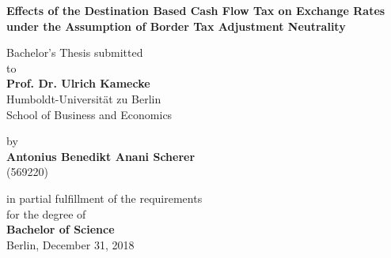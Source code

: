 \begin{center}

    {\Large{\bf Effects of the Destination Based Cash Flow Tax on Exchange Rates under the Assumption of Border Tax Adjustment Neutrality}} \vspace{0.5cm}


    {\normalsize Bachelor's Thesis submitted\\\vspace{0.5cm}
    to}\\\vspace{0.5cm}
    {\normalsize{\bf Prof. Dr. Ulrich Kamecke}} \\\vspace{0.5cm}
    {\normalsize Humboldt-Universit\"at zu Berlin \\
    School of Business and Economics \\} \vspace{1cm}


    {\normalsize by \\\vspace{0.5cm}
    {\bf Antonius Benedikt Anani Scherer} \\
    (569220)} \vspace{1cm}


    {\normalsize in partial fulfillment of the requirements \\
    for the degree of \\
    {\bf Bachelor of Science} \\
    Berlin, December 31, 2018}

\end{center}
